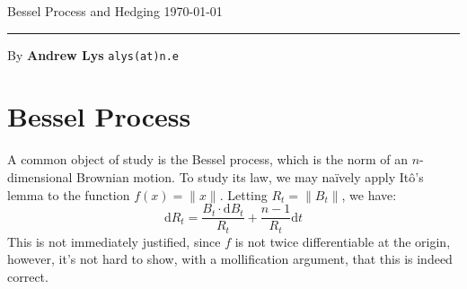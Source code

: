 \documentclass{amsart}
\theoremstyle{definition}
\begin{document}
\noindent
Bessel Process and Hedging   \hfill \today  %
\smallskip
\hrule
\smallskip
\noindent
By {\bf Andrew Lys} \qquad   %
  {\tt alys(at)n.e}      %

\section{Bessel Process}
A common object of study is the Bessel process, which is the norm of an $n$-dimensional Brownian motion. 
To study its law, we may na\"ively apply It\^o's lemma to the function $f(x) = \|x\|$. Letting $R_t = \|B_t\|$, we have:
\begin{equation*}
  \mathrm{d} R_t = \frac{B_t \cdot \mathrm{d} B_t}{R_t} + \frac{n - 1}{R_t} \mathrm{d}t
\end{equation*}
This is not immediately justified, since $f$ is not twice differentiable at the origin, however, it's not hard to show, with a mollification argument, that this is indeed correct. 
\end{document}
